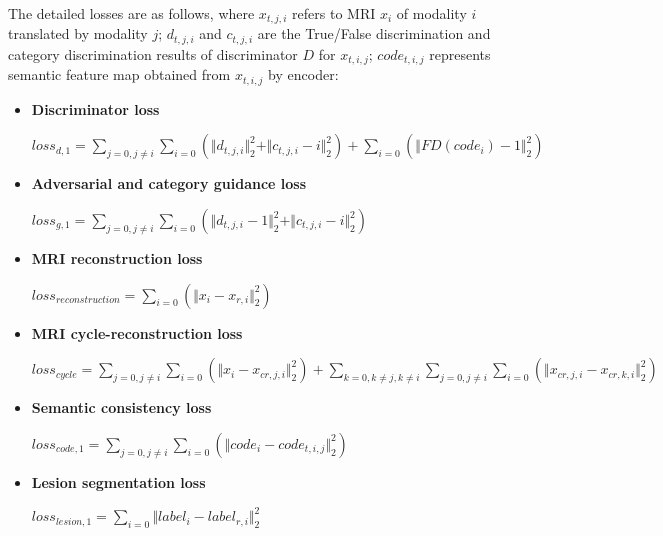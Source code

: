 \documentclass[letterpaper]{article} %
\begin{document}
The detailed losses are as follows, where $x_{t,j,i}$ refers to MRI $x_i$ of modality $i$ translated by modality $j$; $d_{t, j, i}$ and $c_{t, j, i}$ are the True/False discrimination and category discrimination results of discriminator $D$ for $x_{t, i, j}$; $code_{t,i,j}$ represents semantic feature map obtained from $x_{t,i,j}$ by encoder:
\begin{itemize}
	\item \textbf{Discriminator loss}
	\begin{center}
		$loss_{d,1}=\sum\limits_{j=0,j\neq i}\sum\limits_{i=0}(\Vert{d_{t,j,i}}\Vert_{2}^{2}+\Vert{c_{t,j,i}-i}\Vert_{2}^{2})+
		\sum\limits_{i=0}(\Vert{FD(code_{i})-1}\Vert_{2}^{2})$
	\end{center}
	
	\item \textbf{Adversarial and category guidance loss}
	\begin{center}
		$loss_{g,1}=\sum\limits_{j=0,j\neq i}\sum\limits_{i=0}(\Vert{d_{t,j,i}-1}\Vert_{2}^{2}+\Vert{c_{t,j,i}-i}\Vert_{2}^{2})$
	\end{center}
	
	\item \textbf{MRI reconstruction loss}
	\begin{center}
		$loss_{reconstruction}=\sum\limits_{i=0}(\Vert{x_i-x_{r,i}}\Vert_{2}^{2})$
	\end{center}
	
	\item \textbf{MRI cycle-reconstruction loss}
	\begin{center}
		$loss_{cycle}=\sum\limits_{j=0,j\neq i}\sum\limits_{i=0}(\Vert{x_i-x_{cr,j,i}}\Vert_{2}^{2})+\sum\limits_{k=0,k\neq j,k\neq i}\sum\limits_{j=0,j\neq i}\sum\limits_{i=0}(\Vert{x_{cr,j,i}-x_{cr,k,i}}\Vert_{2}^{2})$
	\end{center}
	
	\item \textbf{Semantic consistency loss}
	\begin{center}
		$loss_{code,1}=\sum\limits_{j=0,j\neq i}\sum\limits_{i=0}(\Vert{code_i-code_{t,i,j}}\Vert_{2}^{2})$
	\end{center}
	
	\item \textbf{Lesion segmentation loss}
	\begin{center}
		$loss_{lesion,1}=\sum\limits_{i=0}\Vert{label_i-label_{r,i}}\Vert_{2}^{2}$
	\end{center}
	
\end{itemize}
\end{document}
